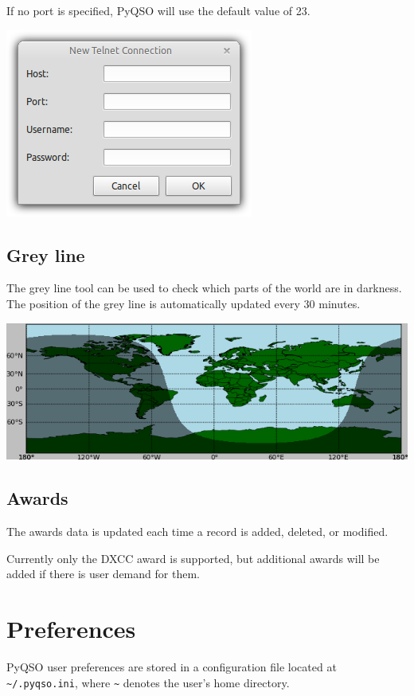 \documentclass[11pt, a4paper]{report}
\begin{document}

If no port is specified, PyQSO will use the default value of 23.

\begin{center}
  \includegraphics[width=0.5\columnwidth]{images/telnet_connection_dialog.png}
\end{center}

\section{Grey line}
The grey line tool can be used to check which parts of the world are in darkness. The position of the grey line is automatically updated every 30 minutes.

\begin{center}
  \includegraphics[width=1\columnwidth]{images/grey_line.png}
\end{center}

\section{Awards}
The awards data is updated each time a record is added, deleted, or modified. 

Currently only the DXCC award is supported, but additional awards will be added if there is user demand for them.

\chapter{Preferences}\label{chap:preferences}
PyQSO user preferences are stored in a configuration file located at \texttt{\textasciitilde/.pyqso.ini}, where \texttt{\textasciitilde} denotes the user's home directory.
\end{document}
